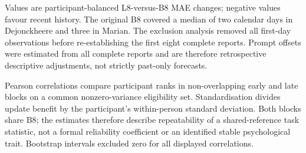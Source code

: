 \documentclass[pdflatex,sn-vancouver-num]{sn-jnl}
\begin{document}
\begin{table}[!htbp]
\caption{EMA first-day and prompt-timing sensitivities.}\label{tab:s18}
\centering\small
{}
\begin{flushleft}\footnotesize Values are participant-balanced L8-versus-B8 MAE changes; negative values favour recent history. The original B8 covered a median of two calendar days in Dejonckheere and three in Marian. The exclusion analysis removed all first-day observations before re-establishing the first eight complete reports. Prompt offsets were estimated from all complete reports and are therefore retrospective descriptive adjustments, not strictly past-only forecasts.\end{flushleft}
\end{table}

\begin{table}[!htbp]
\caption{Early--late temporal generalisability after participant-SD standardisation.}\label{tab:s19}
\centering\small
{}
\begin{flushleft}\footnotesize Pearson correlations compare participant ranks in non-overlapping early and late blocks on a common nonzero-variance eligibility set. Standardisation divides update benefit by the participant's within-person standard deviation. Both blocks share B8; the estimates therefore describe repeatability of a shared-reference task statistic, not a formal reliability coefficient or an identified stable psychological trait. Bootstrap intervals excluded zero for all displayed correlations.\end{flushleft}
\end{table}
\end{document}
